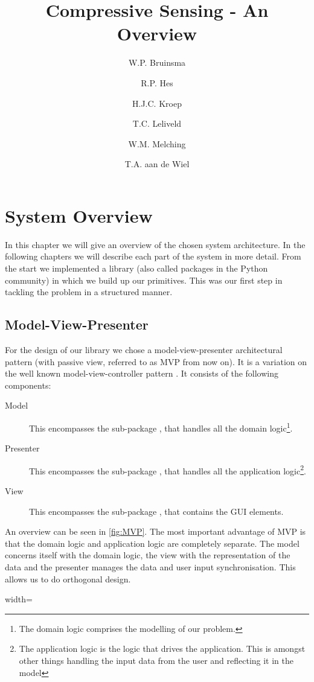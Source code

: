 \documentclass[a4paper, openany, oneside]{memoir}
\title{Compressive Sensing - An Overview}
\author{W.P. Bruinsma \and R.P. Hes \and H.J.C. Kroep \and T.C. Leliveld \and W.M. Melching \and T.A. aan de Wiel}
\begin{document}
\chapter{System Overview}
In this chapter we will give an overview of the chosen system architecture. In the following chapters we will describe each part of the system in more detail. From the start we implemented a library (also called packages in the Python community) in which we build up our primitives. This was our first step in tackling the problem in a structured manner.

\section{Model-View-Presenter}
\label{sec:model-view-presenter}
For the design of our library we chose a model-view-presenter architectural pattern (with passive view, referred to as MVP from now on). It is a variation on the well known model-view-controller pattern \cite{syromiatnikov2014journey}. It consists of the following components:
\begin{description}
    \item[Model] This encompasses the sub-package , that handles all the domain logic\footnote{The domain logic comprises the modelling of our problem.}.
    \item[Presenter] This encompasses the sub-package , that handles all the application logic\footnote{The application logic is the logic that drives the application. This is amongst other things handling the input data from the user and reflecting it in the model}.
    \item[View] This encompasses the sub-package , that contains the GUI elements.
\end{description}
An overview can be seen in \cref{fig:MVP}. The most important advantage of MVP is that the domain logic and application logic are completely separate. The model concerns itself with the domain logic, the view with the representation of the data and the presenter manages the data and user input synchronisation. This allows us to do orthogonal design.

\begin{figure*}
    \centering
	\begin{adjustbox}{width=\textwidth}
    
    \end{adjustbox}
    \caption{Illustration of the MVP pattern as an hierarchical way of separating our system.}
    \label{fig:MVP}
\end{figure*}
\end{document}
